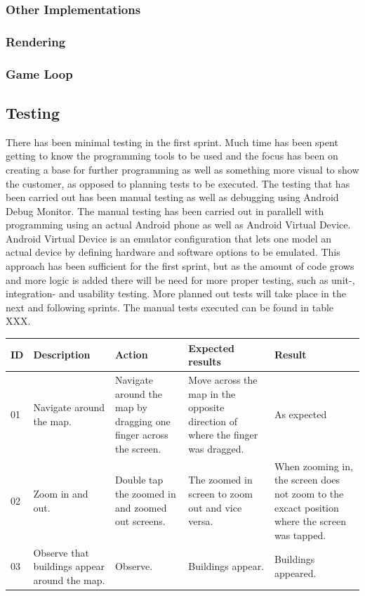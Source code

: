 \subsubsection{Other Implementations}
\subsubsection*{Rendering}
\subsubsection*{Game Loop}

\subsection{Testing}

There has been minimal testing in the first sprint. Much time has been spent getting to know the programming tools to be used and the focus has been on creating a base for further programming as well as something more visual to show the customer, as opposed to planning tests to be executed. The testing that has been carried out has been manual testing as well as debugging using Android Debug Monitor. The manual testing has been carried out in parallell with programming using an actual Android phone as well as Android Virtual Device. Android Virtual Device is an emulator configuration that lets one model an actual device by defining hardware and software options to be emulated. This approach has been sufficient for the first sprint, but as the amount of code grows and more logic is added there will be need for more proper testing, such as unit-, integration- and usability testing. More planned out tests will take place in the next and following sprints. The manual tests executed can be found in table XXX.

\begin{tabular}{| l | p{2.5cm} | p{3cm} | p{3.5cm} | p{2.5cm} |}
	\hline
	{\bf ID} & {\bf Description} & {\bf Action} & {\bf Expected results} & {\bf Result} \\ \hline
	
	01 & Navigate around the map. & Navigate around the map by dragging one finger across the screen. & Move across the map in the opposite direction of where the finger was dragged. & As expected \\ \hline
	
	02 & Zoom in and out. & Double tap the zoomed in and zoomed out screens. & The zoomed in screen to zoom out and vice versa. & When zooming in, the screen does not zoom to the excact position where the screen was tapped. \\ \hline
	
	03 & Observe that buildings appear around the map. & Observe. & Buildings appear. & Buildings appeared. \\ \hline
\end{tabular}

